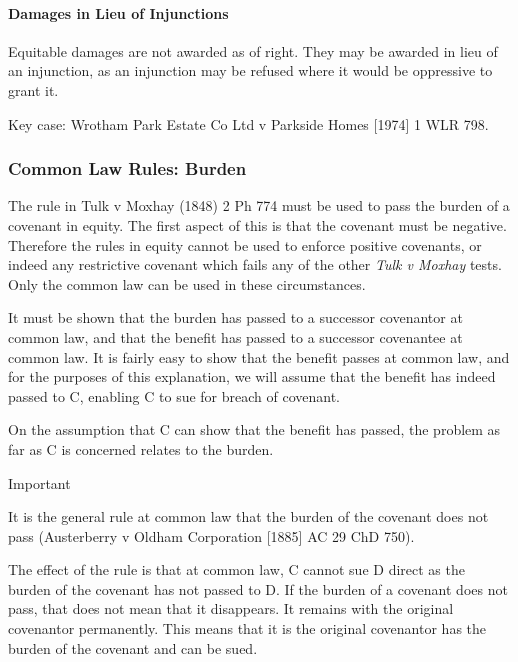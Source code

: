 \documentclass[
]{article}
\newenvironment{env-99436a7e-0b1e-438d-960f-947d510b2b61}
{
    \savenotes\tcolorbox[blanker,breakable,left=5pt,borderline west={2pt}{-4pt}{cyan}]
}
{
    \endtcolorbox\spewnotes
}
\begin{document}
\hypertarget{damages-in-lieu-of-injunctions}{%
\paragraph{Damages in Lieu of
Injunctions}\label{damages-in-lieu-of-injunctions}}

Equitable damages are not awarded as of right. They may be awarded in
lieu of an injunction, as an injunction may be refused where it would be
oppressive to grant it.

Key case: Wrotham Park Estate Co Ltd v Parkside Homes {[}1974{]} 1 WLR
798.

\hypertarget{common-law-rules-burden}{%
\subsubsection{Common Law Rules: Burden}\label{common-law-rules-burden}}

The rule in Tulk v Moxhay (1848) 2 Ph 774 must be used to pass the
burden of a covenant in equity. The first aspect of this is that the
covenant must be negative. Therefore the rules in equity cannot be used
to enforce positive covenants, or indeed any restrictive covenant which
fails any of the other \emph{Tulk v Moxhay} tests. Only the common law
can be used in these circumstances.

It must be shown that the burden has passed to a successor covenantor at
common law, and that the benefit has passed to a successor covenantee at
common law. It is fairly easy to show that the benefit passes at common
law, and for the purposes of this explanation, we will assume that the
benefit has indeed passed to C, enabling C to sue for breach of
covenant.

On the assumption that C can show that the benefit has passed, the
problem as far as C is concerned relates to the burden.

\begin{env-99436a7e-0b1e-438d-960f-947d510b2b61}

Important

It is the general rule at common law that the burden of the covenant
does not pass (Austerberry v Oldham Corporation {[}1885{]} AC 29 ChD
750).

\end{env-99436a7e-0b1e-438d-960f-947d510b2b61}

The effect of the rule is that at common law, C cannot sue D direct as
the burden of the covenant has not passed to D. If the burden of a
covenant does not pass, that does not mean that it disappears. It
remains with the original covenantor permanently. This means that it is
the original covenantor has the burden of the covenant and can be sued.
\end{document}
